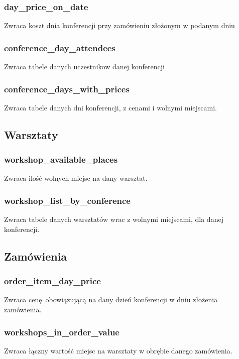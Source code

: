 \documentclass[12pt]{article}
\begin{document}
\subsubsection{day\_price\_on\_date}
Zwraca koszt dnia konferencji przy zamówieniu złożonym w podanym dniu


\subsubsection{conference\_day\_attendees}
Zwraca tabele danych uczestnikow danej konferencji


\subsubsection{conference\_days\_with\_prices}
Zwraca tabele danych dni konferencji, z cenami i wolnymi miejscami.


\subsection{Warsztaty}
\subsubsection{workshop\_available\_places}
Zwraca ilość wolnych miejsc na dany warsztat.


\subsubsection{workshop\_list\_by\_conference}
Zwraca tabele danych warsztatów wrac z wolnymi miejscami, dla danej konferencji.


\subsection{Zamówienia}
\subsubsection{order\_item\_day\_price}
Zwraca cenę obowiązującą na dany dzień konferencji w dniu złożenia zamówienia.


\subsubsection{workshops\_in\_order\_value}
Zwraca łączny wartość miejsc na warsztaty w obrębie danego zamówienia.

\end{document}
